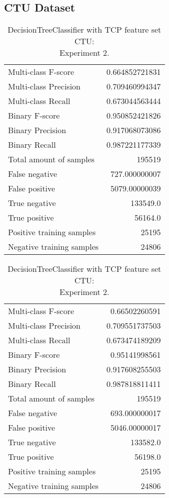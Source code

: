 \subsection{CTU Dataset}

\begin{table}[H]
\begin{minipage}{0.5\textwidth}
\caption{DecisionTreeClassifier with TCP feature set CTU: \\Experiment 1.}
\centering
\begin{tabular}{l r}
\toprule
Multi-class F-score & 0.664852721831 \\
Multi-class Precision & 0.709460994347 \\
Multi-class Recall & 0.673044563444 \\
\midrule
Binary F-score & 0.950852421826 \\
Binary Precision & 0.917068073086 \\
Binary Recall & 0.987221177339 \\
\midrule
Total amount of samples & 195519 \\
False negative & 727.000000007 \\
False positive & 5079.00000039 \\
True negative & 133549.0 \\
True positive & 56164.0 \\
\midrule
Positive training samples & 25195 \\
Negative training samples & 24806 \\
\bottomrule
\end{tabular}
\end{minipage}
\hfillx
\begin{minipage}{0.5\textwidth}
\caption{DecisionTreeClassifier with TCP feature set CTU: \\Experiment 2.}
\centering
\begin{tabular}{l r}
\toprule
Multi-class F-score & 0.66502260591 \\
Multi-class Precision & 0.709551737503 \\
Multi-class Recall & 0.673474189209 \\
\midrule
Binary F-score & 0.95141998561 \\
Binary Precision & 0.917608255503 \\
Binary Recall & 0.987818811411 \\
\midrule
Total amount of samples & 195519 \\
False negative & 693.000000017 \\
False positive & 5046.00000017 \\
True negative & 133582.0 \\
True positive & 56198.0 \\
\midrule
Positive training samples & 25195 \\
Negative training samples & 24806 \\
\bottomrule
\end{tabular}
\end{minipage}
\end{table}
